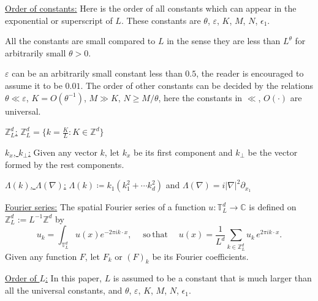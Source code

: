 \underline{Order of constants:} Here is the order of all constants which can appear in the exponential or superscript of $L$. These constants are $\theta$, $\varepsilon$, $K$, $M$, $N$, $\epsilon_1$.%

All the constants are small compared to $L$ in the sense they are less than $L^{\theta}$ for arbitrarily small $\theta>0$.

$\varepsilon$ can be an arbitrarily small constant less than $0.5$, the reader is encouraged to assume it to be $0.01$. The order of other constants can be decided by the relations $\theta\ll \varepsilon$, $K=O(\theta^{-1})$, $M\gg K$, $N\ge M/\theta$, here the constants in $\ll$, $O(\cdot)$ are universal. 

\underline{$\mathbb{Z}_L^d$:} $\mathbb{Z}_L^d= \{k=\frac{K}{L}:K\in \mathbb{Z}^d\}$

\underline{$k_x$, $k_{\perp}$:} Given any vector $k$, let $k_x$ be its first component and $k_{\perp}$ be the vector formed by the rest components. 

\underline{$\Lambda(k)$, $\Lambda(\nabla)$:} $\Lambda(k)\coloneqq k_{1}(k_1^2+\cdots k_d^2)$ and $\Lambda(\nabla) = i|\nabla|^2\partial_{x_1}$

\underline{Fourier series:} The spatial Fourier series of a function $u: \mathbb{T}_L^d \to \mathbb C$ is defined on $\mathbb{Z}^d_L:=L^{-1}\mathbb{Z}^{d}$ by
\begin{equation}\label{fourierset.fourwave}
u_k=\int_{\mathbb{T}^d_L} u(x) e^{-2\pi i k\cdot x},\quad \mathrm{\; so \,that \;}\quad u(x)=\frac{1}{L^d}\sum_{k \in \mathbb{Z}^d_L} u_k \,e^{2\pi i k\cdot x}. 
\end{equation}
Given any function $F$, let $F_k$ or $(F)_k$ be its Fourier coefficients.

\underline{Order of $L$:} In this paper, $L$ is assumed to be a constant that is much larger than all the universal constants, and $\theta$, $\varepsilon$, $K$, $M$, $N$, $\epsilon_1$. 








